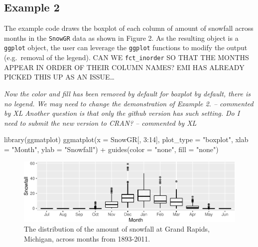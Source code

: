 \documentclass[10pt,a4paper,onecolumn]{article}
\newenvironment{Shaded}{\begin{snugshade}}{\end{snugshade}}
\newcommand{\AttributeTok}[1]{\textcolor[rgb]{0.77,0.63,0.00}{#1}}
\newcommand{\DecValTok}[1]{\textcolor[rgb]{0.00,0.00,0.81}{#1}}
\newcommand{\FunctionTok}[1]{\textcolor[rgb]{0.00,0.00,0.00}{#1}}
\newcommand{\NormalTok}[1]{#1}
\newcommand{\SpecialCharTok}[1]{\textcolor[rgb]{0.00,0.00,0.00}{#1}}
\newcommand{\StringTok}[1]{\textcolor[rgb]{0.31,0.60,0.02}{#1}}
\begin{document}
\hypertarget{example-2}{%
\subsection{Example 2}\label{example-2}}

The example code draws the boxplot of each column of amount of snowfall
across months in the \texttt{SnowGR} data as shown in Figure 2. As the
resulting object is a \texttt{ggplot} object, the user can leverage the
\texttt{ggplot} functions to modify the output (e.g.~removal of the
legend). CAN WE \texttt{fct\_inorder} SO THAT THE MONTHS APPEAR IN ORDER
OF THEIR COLUMN NAMES? EMI HAS ALREADY PICKED THIS UP AS AN
ISSUE\ldots{}

\emph{Now the color and fill has been removed by default for boxplot by
default, there is no legend. We may need to change the demonstration of
Example 2. -- commented by XL} \emph{Another question is that only the
github version has such setting. Do I need to submit the new version to
CRAN? -- commented by XL}

\begin{Shaded}
\begin{Highlighting}[]
\FunctionTok{library}\NormalTok{(ggmatplot)}
\FunctionTok{ggmatplot}\NormalTok{(}\AttributeTok{x =}\NormalTok{ SnowGR[, }\DecValTok{3}\SpecialCharTok{:}\DecValTok{14}\NormalTok{], }\AttributeTok{plot\_type =} \StringTok{"boxplot"}\NormalTok{,}
          \AttributeTok{xlab =} \StringTok{"Month"}\NormalTok{,  }\AttributeTok{ylab =} \StringTok{"Snowfall"}\NormalTok{) }\SpecialCharTok{+}
  \FunctionTok{guides}\NormalTok{(}\AttributeTok{color =} \StringTok{"none"}\NormalTok{, }\AttributeTok{fill =} \StringTok{"none"}\NormalTok{)}
\end{Highlighting}
\end{Shaded}

\begin{figure}
\centering
\includegraphics{paper_files/figure-latex/matplot3-1.pdf}
\caption{The distribution of the amount of snowfall at Grand Rapids,
Michigan, across months from 1893-2011.}
\end{figure}
\end{document}
